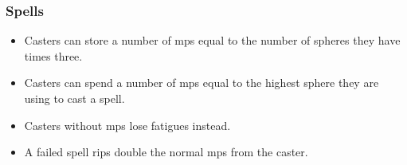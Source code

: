 \subsubsection*{Spells}
\begin{itemize}
  \item
  Casters can store a number of \glspl{mp} equal to the number of spheres they have times three.
  \item
  Casters can spend a number of \glspl{mp} equal to the highest sphere they are using to cast a spell.
  \item
  Casters without \glspl{mp} lose \glspl{fatigue} instead.
  \item
  A failed spell rips double the normal \glspl{mp} from the caster.
\end{itemize}
